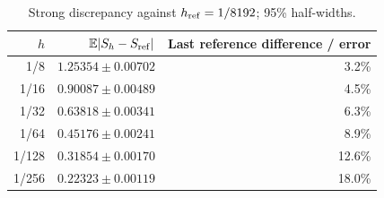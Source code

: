 \begin{table}[H]\centering\small
\caption{Strong discrepancy against $h_{\rm ref}=1/8192$; 95\% half-widths.}
\begin{tabular}{rrr}\toprule
$h$ & $\mathbb E|S_h-S_{\rm ref}|$ & Last reference difference / error\\\midrule
1/8 & $1.25354\pm0.00702$ & 3.2\%\\
1/16 & $0.90087\pm0.00489$ & 4.5\%\\
1/32 & $0.63818\pm0.00341$ & 6.3\%\\
1/64 & $0.45176\pm0.00241$ & 8.9\%\\
1/128 & $0.31854\pm0.00170$ & 12.6\%\\
1/256 & $0.22323\pm0.00119$ & 18.0\%\\
\bottomrule\end{tabular}
\end{table}
